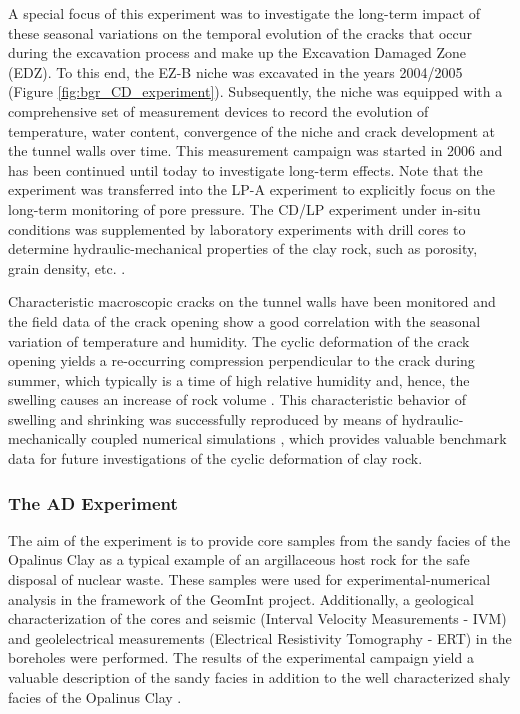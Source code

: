 A special focus of this experiment was to investigate the long-term impact of these seasonal variations on the temporal evolution of the cracks that occur during the excavation process and make up the Excavation Damaged Zone (EDZ). To this end, the EZ-B niche was excavated in the years 2004/2005 (Figure \ref{fig:bgr_CD_experiment}). Subsequently, the niche was equipped with a comprehensive set of measurement devices to record the evolution of temperature, water content, convergence of the niche and crack development at the tunnel walls over time. This measurement campaign was started in 2006 and has been continued until today to investigate long-term effects. Note that the experiment was transferred into the LP-A experiment to explicitly focus on the long-term monitoring of pore pressure. The CD/LP experiment under in-situ conditions was supplemented by laboratory experiments with drill cores to determine hydraulic-mechanical properties of the clay rock, such as porosity, grain density, etc. \cite{matray2013}. 

Characteristic macroscopic cracks on the tunnel walls have been monitored and the field data of the crack opening show a good correlation with the seasonal variation of temperature and humidity. The cyclic deformation of the crack opening yields a re-occurring compression perpendicular to the crack during summer, which typically is a time of high relative humidity and, hence, the swelling causes an increase of rock volume \cite{jaeggi2012}. This characteristic behavior of swelling and shrinking was successfully reproduced by means of hydraulic-mechanically coupled numerical simulations \cite{ziefle2018}, which provides valuable benchmark data for future investigations of the cyclic deformation of clay rock.

\subsubsection{The AD Experiment}

The aim of the experiment is to provide core samples from the sandy facies of the Opalinus Clay as a typical example of an argillaceous host rock for the safe disposal of nuclear waste. These samples were used for experimental-numerical analysis in the framework of the GeomInt project. Additionally, a geological characterization of the cores and seismic (Interval Velocity Measurements - IVM) and geolelectrical measurements (Electrical Resistivity Tomography - ERT) in the boreholes were performed. The results of the experimental campaign yield a valuable description of the sandy facies in addition to the well characterized shaly facies of the Opalinus Clay \cite{bossart2008,jahn2016}. 

